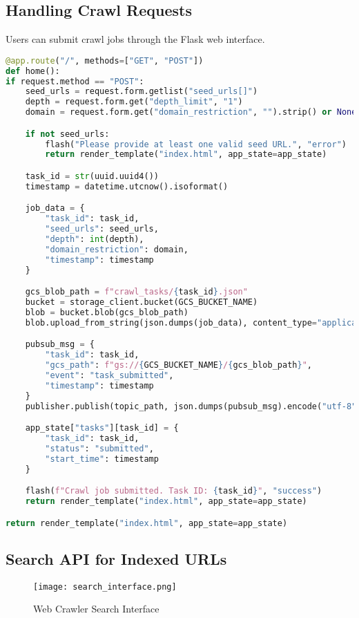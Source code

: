 \documentclass[12pt,a4paper]{report}
\begin{document}
\subsection{Handling Crawl Requests}
Users can submit crawl jobs through the Flask web interface.
\begin{lstlisting}[language=Python]
@app.route("/", methods=["GET", "POST"])
def home():
if request.method == "POST":
    seed_urls = request.form.getlist("seed_urls[]")
    depth = request.form.get("depth_limit", "1")
    domain = request.form.get("domain_restriction", "").strip() or None

    if not seed_urls:
        flash("Please provide at least one valid seed URL.", "error")
        return render_template("index.html", app_state=app_state)

    task_id = str(uuid.uuid4())
    timestamp = datetime.utcnow().isoformat()

    job_data = {
        "task_id": task_id,
        "seed_urls": seed_urls,
        "depth": int(depth),
        "domain_restriction": domain,
        "timestamp": timestamp
    }

    gcs_blob_path = f"crawl_tasks/{task_id}.json"
    bucket = storage_client.bucket(GCS_BUCKET_NAME)
    blob = bucket.blob(gcs_blob_path)
    blob.upload_from_string(json.dumps(job_data), content_type="application/json")

    pubsub_msg = {
        "task_id": task_id,
        "gcs_path": f"gs://{GCS_BUCKET_NAME}/{gcs_blob_path}",
        "event": "task_submitted",
        "timestamp": timestamp
    }
    publisher.publish(topic_path, json.dumps(pubsub_msg).encode("utf-8"))

    app_state["tasks"][task_id] = {
        "task_id": task_id,
        "status": "submitted",
        "start_time": timestamp
    }

    flash(f"Crawl job submitted. Task ID: {task_id}", "success")
    return render_template("index.html", app_state=app_state)

return render_template("index.html", app_state=app_state)
\end{lstlisting}

\subsection{Search API for Indexed URLs}
\begin{figure}[htb!]
    \centering
    \texttt{[image: search\_interface.png]}
    \caption{Web Crawler Search Interface}
    \label{fig:search-interface}
\end{figure}
\end{document}
